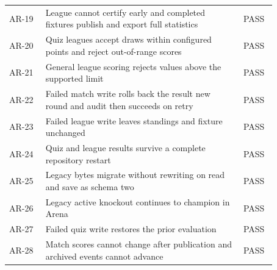 \begin{longtable}{p{0.12\linewidth}p{0.65\linewidth}p{0.1\linewidth}}
AR-19 & League cannot certify early and completed fixtures publish and export full statistics & PASS\\
AR-20 & Quiz leagues accept draws within configured points and reject out-of-range scores & PASS\\
AR-21 & General league scoring rejects values above the supported limit & PASS\\
AR-22 & Failed match write rolls back the result new round and audit then succeeds on retry & PASS\\
AR-23 & Failed league write leaves standings and fixture unchanged & PASS\\
AR-24 & Quiz and league results survive a complete repository restart & PASS\\
AR-25 & Legacy bytes migrate without rewriting on read and save as schema two & PASS\\
AR-26 & Legacy active knockout continues to champion in Arena & PASS\\
AR-27 & Failed quiz write restores the prior evaluation & PASS\\
AR-28 & Match scores cannot change after publication and archived events cannot advance & PASS\\
\bottomrule\end{longtable}\normalsize
